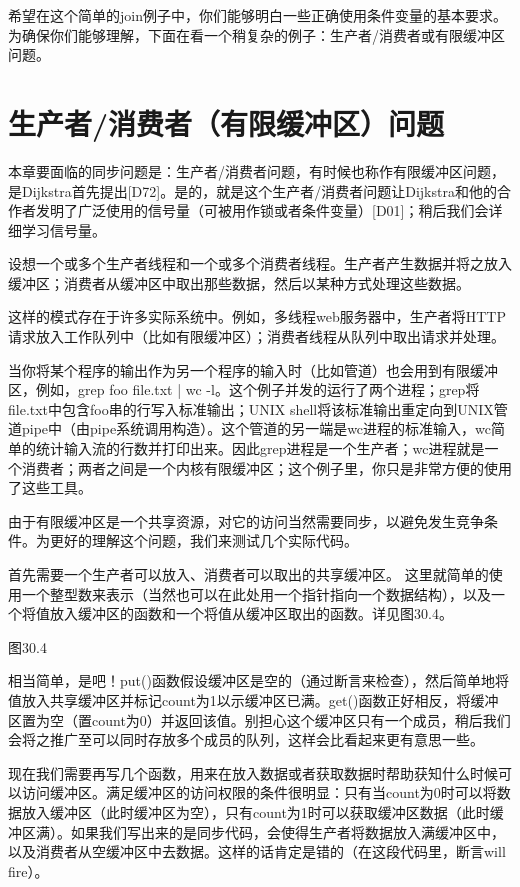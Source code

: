 希望在这个简单的join例子中，你们能够明白一些正确使用条件变量的基本要求。为确保你们能够理解，下面在看一个稍复杂的例子：生产者/消费者或有限缓冲区问题。



\section{生产者/消费者（有限缓冲区）问题}
本章要面临的同步问题是：生产者/消费者问题，有时候也称作有限缓冲区问题，是Dijkstra首先提出[D72]。是的，就是这个生产者/消费者问题让Dijkstra和他的合作者发明了广泛使用的信号量（可被用作锁或者条件变量）[D01]；稍后我们会详细学习信号量。

设想一个或多个生产者线程和一个或多个消费者线程。生产者产生数据并将之放入缓冲区；消费者从缓冲区中取出那些数据，然后以某种方式处理这些数据。

这样的模式存在于许多实际系统中。例如，多线程web服务器中，生产者将HTTP请求放入工作队列中（比如有限缓冲区）；消费者线程从队列中取出请求并处理。

当你将某个程序的输出作为另一个程序的输入时（比如管道）也会用到有限缓冲区，例如，grep foo file.txt | wc -l。这个例子并发的运行了两个进程；grep将file.txt中包含foo串的行写入标准输出；UNIX shell将该标准输出重定向到UNIX管道pipe中（由pipe系统调用构造）。这个管道的另一端是wc进程的标准输入，wc简单的统计输入流的行数并打印出来。因此grep进程是一个生产者；wc进程就是一个消费者；两者之间是一个内核有限缓冲区；这个例子里，你只是非常方便的使用了这些工具。

由于有限缓冲区是一个共享资源，对它的访问当然需要同步，以避免发生竞争条件。为更好的理解这个问题，我们来测试几个实际代码。

首先需要一个生产者可以放入、消费者可以取出的共享缓冲区。 这里就简单的使用一个整型数来表示（当然也可以在此处用一个指针指向一个数据结构），以及一个将值放入缓冲区的函数和一个将值从缓冲区取出的函数。详见图30.4。

图30.4

相当简单，是吧！put()函数假设缓冲区是空的（通过断言来检查），然后简单地将值放入共享缓冲区并标记count为1以示缓冲区已满。get()函数正好相反，将缓冲区置为空（置count为0）并返回该值。别担心这个缓冲区只有一个成员，稍后我们会将之推广至可以同时存放多个成员的队列，这样会比看起来更有意思一些。

现在我们需要再写几个函数，用来在放入数据或者获取数据时帮助获知什么时候可以访问缓冲区。满足缓冲区的访问权限的条件很明显：只有当count为0时可以将数据放入缓冲区（此时缓冲区为空），只有count为1时可以获取缓冲区数据（此时缓冲区满）。如果我们写出来的是同步代码，会使得生产者将数据放入满缓冲区中，以及消费者从空缓冲区中去数据。这样的话肯定是错的（在这段代码里，断言will fire）。

